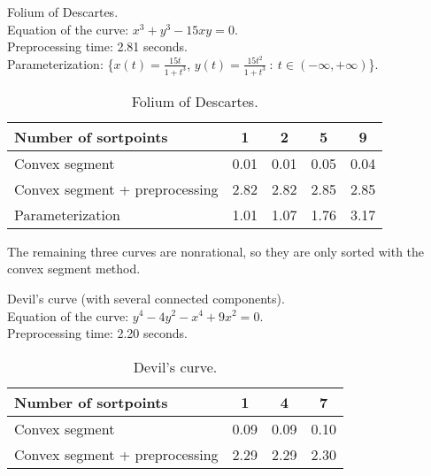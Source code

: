 \begin{example}
\label{eg-folium}
{\samepage
Folium of Descartes.\\
\indent Equation of the curve: $x^{3} + y^{3} - 15xy = 0$.\\
\indent Preprocessing time: 2.81 seconds.\\
\indent Parameterization: \{$x(t) = \frac{15t}{1+t^{3}}$, $y(t) = 
\frac{15t^{2}}{1+t^{3}}\ :\ t \in (-\infty, +\infty)$\}.

}
\begin{table}[htbp]
\caption{Folium of Descartes.}
\begin{center}
\begin{tabular}{|l|c|c|c|c|} \hline
Number of sortpoints & 1 & 2 & 5 & 9 \\ \hline \hline
Convex segment &           0.01 & 0.01 & 0.05 & 0.04 \\ \hline
Convex segment + preprocessing & 2.82 & 2.82 & 2.85 & 2.85 \\ \hline
Parameterization & 1.01 & 1.07 & 1.76 & 3.17 \\ \hline
\end{tabular}
\end{center}
\end{table}
\end{example}

The remaining three curves are nonrational, so they are only 
sorted with the convex segment method.

\vspace{.2in}

\begin{example}
\label{eg-devil}
{\samepage
Devil's curve (with several connected components).\\
\indent Equation of the curve: $y^{4} - 4y^{2} - x^{4} + 9x^{2} = 0$.\\
\indent Preprocessing time: 2.20 seconds.

}

\begin{table}[htbp]
\caption{Devil's curve.}
\begin{center}
\begin{tabular}{|l|c|c|c|} \hline
Number of sortpoints & 1 & 4 & 7 \\ \hline \hline
Convex segment & 0.09 & 0.09 & 0.10 \\ \hline
Convex segment + preprocessing & 2.29 & 2.29 & 2.30 \\ \hline
\end{tabular}
\end{center}
\end{table}
\end{example}


